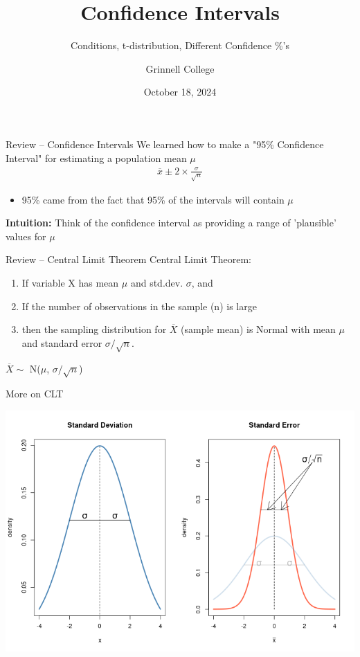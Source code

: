 \documentclass{beamer}
\title[STAT-209]{Confidence Intervals}
\subtitle{Conditions, t-distribution, Different Confidence \%'s}
\author{Grinnell College}
\date{October 18, 2024}
\begin{document}
\begin{frame}
  \titlepage
\end{frame}

\begin{frame}{Review -- Confidence Intervals}
We learned how to make a "95\% Confidence Interval" for estimating a population mean $\mu$
\begin{align*}
\overline{x} \pm 2 \times \frac{\sigma}{\sqrt{n}}
\end{align*}
\begin{itemize}
    \item 95\% came from the fact that 95\% of the intervals will contain $\mu$
\end{itemize} \vspace{12mm}

\textbf{Intuition:} Think of the confidence interval as providing a range of 'plausible' values for $\mu$
\end{frame}

\begin{frame}{Review -- Central Limit Theorem}
Central Limit Theorem:
\begin{enumerate}
    \item If variable X has mean $\mu$ and std.dev. $\sigma$, and
    \item If the number of observations in the sample (n) is large
    \item then the sampling distribution for $\overline{X}$ (sample mean) is Normal with mean $\mu$ and standard error $\sigma / \sqrt{n}$.
\end{enumerate}
\begin{center}
    $\overline{X} \sim$ N($\mu$, $\sigma / \sqrt{n}$)
\end{center}
\end{frame}

\begin{frame}{More on CLT}
\begin{center}
\includegraphics[scale=.4]{sd_vs_se.png}
\end{center}
\end{frame}
\end{document}

